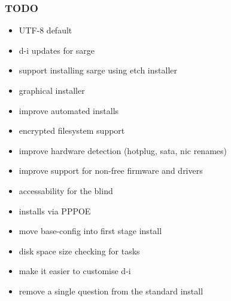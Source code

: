 \documentclass{beamer}
\begin{document}
\begin{frame}
  \frametitle{TODO}
  	\begin{itemize}
	\item UTF-8 default
	\item d-i updates for sarge
	\item support installing sarge using etch installer
	\item graphical installer
	\item improve automated installs
	\item encrypted filesystem support
	\item improve hardware detection (hotplug, sata, nic renames)
	\item improve support for non-free firmware and drivers
	\item accessability for the blind
	\item installs via PPPOE
	\item move base-config into first stage install
	\item disk space size checking for tasks
	\item make it easier to customise d-i
	\item remove a single question from the standard install
	\end{itemize}
\end{frame}
\end{document}
